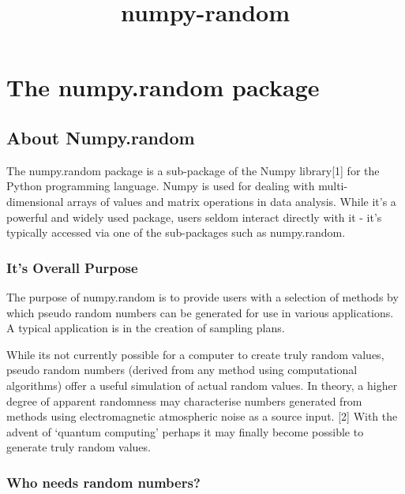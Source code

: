 \documentclass[11pt]{article}
\title{numpy-random}
\begin{document}
    
    
    \maketitle
    
    

    
    \section{The numpy.random package}\label{the-numpy.random-package}

    \subsection{About Numpy.random}\label{about-numpy.random}

The numpy.random package is a sub-package of the Numpy library{[}1{]}
for the Python programming language. Numpy is used for dealing with
multi-dimensional arrays of values and matrix operations in data
analysis. While it's a powerful and widely used package, users seldom
interact directly with it - it's typically accessed via one of the
sub-packages such as numpy.random.

    \subsubsection{It's Overall Purpose}\label{its-overall-purpose}

The purpose of numpy.random is to provide users with a selection of
methods by which pseudo random numbers can be generated for use in
various applications. A typical application is in the creation of
sampling plans.

While its not currently possible for a computer to create truly random
values, pseudo random numbers (derived from any method using
computational algorithms) offer a useful simulation of actual random
values. In theory, a higher degree of apparent randomness may
characterise numbers generated from methods using electromagnetic
atmospheric noise as a source input. {[}2{]} With the advent of `quantum
computing' perhaps it may finally become possible to generate truly
random values.

    \subsubsection{Who needs random
numbers?}\label{who-needs-random-numbers}
\end{document}
